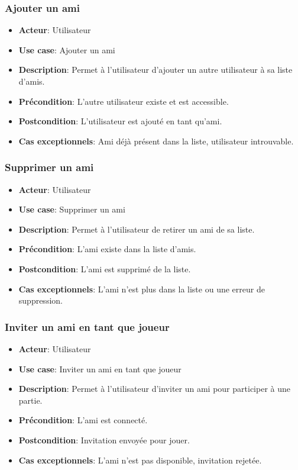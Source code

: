 \documentclass{article}
\begin{document}
\subsubsection*{Ajouter un ami}
\begin{itemize}
    \item \textbf{Acteur}: Utilisateur
    \item \textbf{Use case}: Ajouter un ami
    \item \textbf{Description}: Permet à l'utilisateur d'ajouter un autre utilisateur à sa liste d'amis.
    \item \textbf{Précondition}: L'autre utilisateur existe et est accessible.
    \item \textbf{Postcondition}: L'utilisateur est ajouté en tant qu'ami.
    \item \textbf{Cas exceptionnels}: Ami déjà présent dans la liste, utilisateur introuvable.
\end{itemize}

\subsubsection*{Supprimer un ami}
\begin{itemize}
    \item \textbf{Acteur}: Utilisateur
    \item \textbf{Use case}: Supprimer un ami
    \item \textbf{Description}: Permet à l'utilisateur de retirer un ami de sa liste.
    \item \textbf{Précondition}: L'ami existe dans la liste d'amis.
    \item \textbf{Postcondition}: L'ami est supprimé de la liste.
    \item \textbf{Cas exceptionnels}: L'ami n'est plus dans la liste ou une erreur de suppression.
\end{itemize}

\subsubsection*{Inviter un ami en tant que joueur}
\begin{itemize}
    \item \textbf{Acteur}: Utilisateur
    \item \textbf{Use case}: Inviter un ami en tant que joueur
    \item \textbf{Description}: Permet à l'utilisateur d'inviter un ami pour participer à une partie.
    \item \textbf{Précondition}: L'ami est connecté.
    \item \textbf{Postcondition}: Invitation envoyée pour jouer.
    \item \textbf{Cas exceptionnels}: L'ami n'est pas disponible, invitation rejetée.
\end{itemize}
\end{document}

